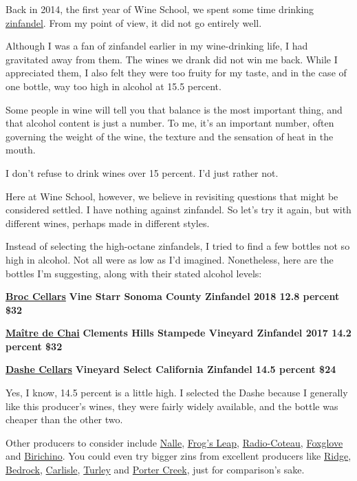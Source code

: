 Back in 2014, the first year of Wine School, we spent some time drinking
\href{https://www.nytimes3xbfgragh.onion/2014/07/09/dining/your-next-lesson-zinfandel.html}{zinfandel}.
From my point of view, it did not go entirely well.

Although I was a fan of zinfandel earlier in my wine-drinking life, I
had gravitated away from them. The wines we drank did not win me back.
While I appreciated them, I also felt they were too fruity for my taste,
and in the case of one bottle, way too high in alcohol at 15.5 percent.

Some people in wine will tell you that balance is the most important
thing, and that alcohol content is just a number. To me, it's an
important number, often governing the weight of the wine, the texture
and the sensation of heat in the mouth.

I don't refuse to drink wines over 15 percent. I'd just rather not.

Here at Wine School, however, we believe in revisiting questions that
might be considered settled. I have nothing against zinfandel. So let's
try it again, but with different wines, perhaps made in different
styles.

Instead of selecting the high-octane zinfandels, I tried to find a few
bottles not so high in alcohol. Not all were as low as I'd imagined.
Nonetheless, here are the bottles I'm suggesting, along with their
stated alcohol levels:

\href{https://broccellars.com/}{\textbf{Broc Cellars}} \textbf{Vine
Starr Sonoma County Zinfandel 2018 12.8 percent \$32}

\href{https://www.mdc.wine/}{\textbf{Maître de Chai}} \textbf{Clements
Hills Stampede Vineyard Zinfandel 2017 14.2 percent \$32}

\href{https://www.dashecellars.com/}{\textbf{Dashe Cellars}}
\textbf{Vineyard Select California Zinfandel 14.5 percent \$24}

Yes, I know, 14.5 percent is a little high. I selected the Dashe because
I generally like this producer's wines, they were fairly widely
available, and the bottle was cheaper than the other two.

Other producers to consider include
\href{https://www.nallewinery.com/}{Nalle},
\href{https://www.frogsleap.com/}{Frog's Leap},
\href{https://radiocoteau.com/}{Radio-Coteau},
\href{http://varnerwine.com/}{Foxglove} and
\href{http://www.birichino.com/}{Birichino}. You could even try bigger
zins from excellent producers like
\href{https://www.ridgewine.com/}{Ridge},
\href{https://www.bedrockwineco.com/}{Bedrock},
\href{https://www.carlislewinery.com/}{Carlisle},
\href{http://www.turleywinecellars.com/}{Turley} and
\href{https://portercreekvineyards.com/}{Porter Creek}, just for
comparison's sake.

